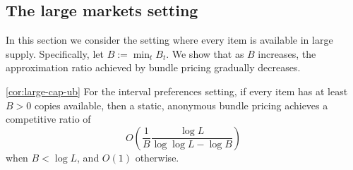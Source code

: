 \subsection{The large markets setting}
\label{sec:large-cap-ub}

In this section we consider the setting where every item is available in large
supply. Specifically, let $B:= \min_t B_t$. We show that as $B$ increases, the
approximation ratio achieved by bundle pricing gradually decreases. 

\begin{numberedtheorem}{\ref{cor:large-cap-ub}}
For the interval preferences setting, if every item has at least $B>0$
copies available, then a static, anonymous bundle pricing achieves a
competitive ratio of
\[
    O\left(\frac1B\frac{\log L}{\log\log L - \log B}\right)
\] 
when $B<\log L$, and $O(1)$ otherwise.
\end{numberedtheorem}


